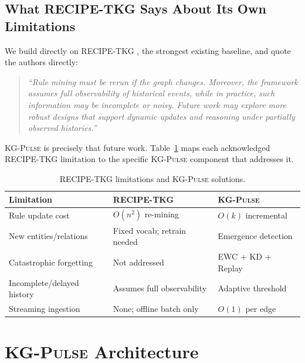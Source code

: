 \documentclass[10pt,a4paper,twocolumn]{article}
\theoremstyle{definition}
\newcommand{\ourmodel}{\textsc{KG-Pulse}}
\newcommand{\basemodel}{RECIPE-TKG}
\begin{document}
\subsection{What \basemodel{} Says About Its Own Limitations}

We build directly on \basemodel{} \cite{Akgul2025recipe}, the strongest
existing baseline, and quote the authors directly:

\begin{quote}\small\itshape
``Rule mining must be rerun if the graph changes.
Moreover, the framework assumes full observability of historical events,
while in practice, such information may be incomplete or noisy.
Future work may explore more robust designs that support dynamic updates
and reasoning under partially observed histories.''
\end{quote}

\ourmodel{} is precisely that future work.
Table~\ref{tab:limitations} maps each acknowledged \basemodel{} limitation
to the specific \ourmodel{} component that addresses it.

\begin{table}[h!]
\centering
\caption{\basemodel{} limitations and \ourmodel{} solutions.}
\label{tab:limitations}
\scriptsize
\renewcommand{\arraystretch}{1.25}
\begin{tabularx}{\columnwidth}{lXX}
\toprule
\textbf{Limitation}        & \textbf{\basemodel{}}        & \textbf{\ourmodel{}} \\
\midrule
Rule update cost           & $O(n^2)$ re-mining            & $O(k)$ incremental \\
New entities/relations     & Fixed vocab; retrain needed   & Emergence detection \\
Catastrophic forgetting    & Not addressed                 & EWC + KD + Replay \\
Incomplete/delayed history & Assumes full observability    & Adaptive threshold \\
Streaming ingestion        & None; offline batch only      & $O(1)$ per edge \\
\bottomrule
\end{tabularx}
\end{table}

\section{\ourmodel{} Architecture}
\label{sec:architecture}
\end{document}
